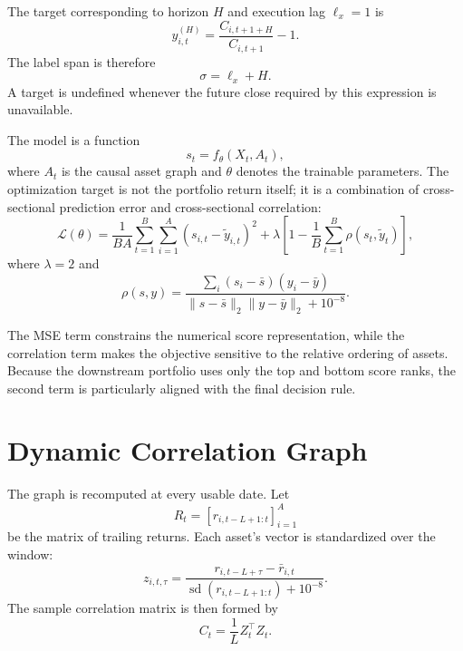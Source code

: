 \documentclass[10pt]{article}
\begin{document}
The target corresponding to horizon $H$ and execution lag $\ell_x=1$ is
\begin{equation}
y_{i,t}^{(H)}
=
\frac{C_{i,t+1+H}}{C_{i,t+1}}-1.
\end{equation}
The label span is therefore
\begin{equation}
\sigma=\ell_x+H.
\end{equation}
A target is undefined whenever the future close required by this expression is unavailable.

The model is a function
\begin{equation}
s_t=f_\theta(X_t,A_t),
\end{equation}
where $A_t$ is the causal asset graph and $\theta$ denotes the trainable parameters. The optimization target is not the portfolio return itself; it is a combination of cross-sectional prediction error and cross-sectional correlation:
\begin{equation}
\mathcal{L}(\theta)
=
\frac{1}{BA}
\sum_{t=1}^{B}\sum_{i=1}^{A}
(s_{i,t}-\tilde y_{i,t})^2
+
\lambda
\left[
1-\frac{1}{B}\sum_{t=1}^{B}
\rho(s_t,\tilde y_t)
\right],
\end{equation}
where $\lambda=2$ and
\begin{equation}
\rho(s,y)
=
\frac{
\sum_i(s_i-\bar s)(y_i-\bar y)
}{
\|s-\bar s\|_2\|y-\bar y\|_2+10^{-8}
}.
\end{equation}

The MSE term constrains the numerical score representation, while the correlation term makes the objective sensitive to the relative ordering of assets. Because the downstream portfolio uses only the top and bottom score ranks, the second term is particularly aligned with the final decision rule.

\section{Dynamic Correlation Graph}

The graph is recomputed at every usable date. Let
\begin{equation}
R_t=
\left[
r_{i,t-L+1:t}
\right]_{i=1}^{A}
\end{equation}
be the matrix of trailing returns. Each asset's vector is standardized over the window:
\begin{equation}
z_{i,t,\tau}
=
\frac{r_{i,t-L+\tau}-\bar r_{i,t}}
{\operatorname{sd}(r_{i,t-L+1:t})+10^{-8}}.
\end{equation}
The sample correlation matrix is then formed by
\begin{equation}
C_t
=
\frac{1}{L}Z_t^\top Z_t.
\end{equation}
\end{document}
